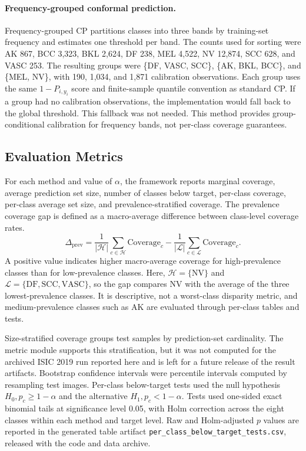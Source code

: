 ﻿\documentclass[preprint,12pt]{elsarticle}
\begin{document}
\paragraph{Frequency-grouped conformal prediction.}
Frequency-grouped CP partitions classes into three bands by training-set frequency and estimates one threshold per band. The counts used for sorting were AK 867, BCC 3,323, BKL 2,624, DF 238, MEL 4,522, NV 12,874, SCC 628, and VASC 253. The resulting groups were \{DF, VASC, SCC\}, \{AK, BKL, BCC\}, and \{MEL, NV\}, with 190, 1,034, and 1,871 calibration observations. Each group uses the same $1-P_{i,y_i}$ score and finite-sample quantile convention as standard CP. If a group had no calibration observations, the implementation would fall back to the global threshold. This fallback was not needed. This method provides group-conditional calibration for frequency bands, not per-class coverage guarantees.

\subsection{Evaluation Metrics}

For each method and value of $\alpha$, the framework reports marginal coverage, average prediction set size, number of classes below target, per-class coverage, per-class average set size, and prevalence-stratified coverage. The prevalence coverage gap is defined as a macro-average difference between class-level coverage rates.
\[
\Delta_{\mathrm{prev}} =
\frac{1}{|\mathcal{H}|}\sum_{c\in\mathcal{H}}\mathrm{Coverage}_c -
\frac{1}{|\mathcal{L}|}\sum_{c\in\mathcal{L}}\mathrm{Coverage}_c .
\]
A positive value indicates higher macro-average coverage for high-prevalence classes than for low-prevalence classes. Here, $\mathcal{H}=\{\mathrm{NV}\}$ and $\mathcal{L}=\{\mathrm{DF},\mathrm{SCC},\mathrm{VASC}\}$, so the gap compares NV with the average of the three lowest-prevalence classes. It is descriptive, not a worst-class disparity metric, and medium-prevalence classes such as AK are evaluated through per-class tables and tests.

Size-stratified coverage groups test samples by prediction-set cardinality. The metric module supports this stratification, but it was not computed for the archived ISIC 2019 run reported here and is left for a future release of the result artifacts. Bootstrap confidence intervals were percentile intervals computed by resampling test images. Per-class below-target tests used the null hypothesis $H_0, p_c \geq 1-\alpha$ and the alternative $H_1, p_c < 1-\alpha$. Tests used one-sided exact binomial tails at significance level 0.05, with Holm correction across the eight classes within each method and target level. Raw and Holm-adjusted $p$ values are reported in the generated table artifact \texttt{per\_class\_below\_target\_tests.csv}, released with the code and data archive.
\end{document}
